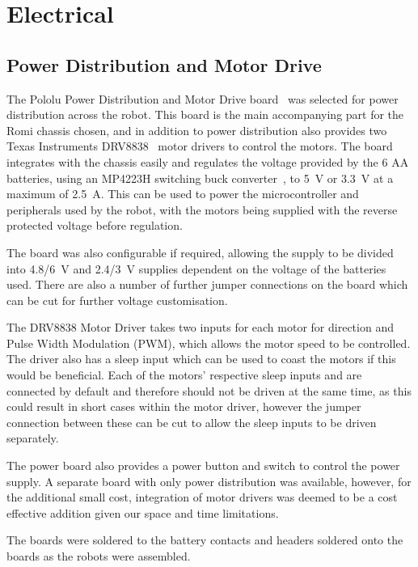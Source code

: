 
\chapter{Electrical}\label{electrical}

\section{Power Distribution and Motor Drive}\label{elec/poweranddrive}
The Pololu Power Distribution and Motor Drive board~\cite{pololupower}
was selected for power distribution across
the robot. This board is the main accompanying part for the Romi
chassis chosen, and in addition to power distribution also provides
two Texas Instruments DRV8838~\cite{texasdrivers} motor drivers to control the motors. The board integrates with the chassis easily
and regulates the voltage provided by the 6 AA batteries, using an
MP4223H switching buck converter~\cite{mpbuck}, to \SI{5}{\volt} or
\SI{3.3}{\volt} at a maximum of \SI{2.5}{\ampere}. This can be used
to power the microcontroller and peripherals used by the robot, with the motors being supplied with the reverse protected voltage before
regulation.

The board was also configurable if required, allowing the supply to be
divided into \SI{4.8/6}{\volt} and \SI{2.4/3}{\volt} supplies dependent on the voltage of the batteries used.
There are also a number of further jumper connections on the board which can
be cut for further voltage customisation.

The DRV8838 Motor Driver takes two inputs for each motor for direction and Pulse Width
Modulation (PWM), which allows the motor speed to be controlled. The
driver also has a sleep input which can be used to coast the motors if
this would be beneficial. Each of the motors' respective sleep inputs
and are connected by default and therefore should not be driven at the same time, as this could result in short cases within the motor driver, however
the jumper connection between these can be cut to allow the sleep inputs to
be driven separately.

The power board also provides a power button and switch to control the
power supply. A separate board with only power distribution was
available, however, for the additional small cost, integration of
motor drivers was deemed to be a cost effective addition given our space and time limitations.

The boards were soldered to the battery contacts and headers soldered
onto the boards as the robots were assembled.
